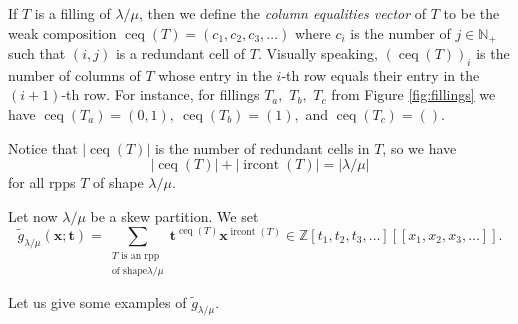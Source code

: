 \documentclass[12pt]{article}
\theoremstyle{plain}
\theoremstyle{definition}
\let\sumnonlimits\sum
\renewcommand{\sum}{\sumnonlimits\limits}
\def\ceq{{\operatorname{ceq}}}
\def\ircont{{\operatorname{ircont}}}
\def\t{{\mathbf{t}}}
\def\lm{{\lambda/\mu}}
\def\Z{{\mathbb{Z}}}
\begin{document}
 If $T$ is a filling of $\lm$,
then we define the \textit{column equalities vector} of $T$ to be the weak composition
$\operatorname{ceq}\left(  T\right)=\left(c_1,c_2,c_3,\dots\right)$
where $c_i$ is the number of $j\in\mathbb{N}_{+}$ such that $\left(  i,j\right)$ is a redundant cell of $T$. Visually speaking, $\left(  \operatorname{ceq}\left(  T\right)  \right)
_{i}$ is the number of columns of $T$ whose entry in the $i$-th row equals
their entry in the $\left(  i+1\right)  $-th row. For instance, for fillings $T_a,$ $T_b,$ $T_c$ from Figure \ref{fig:fillings} we have $\ceq(T_a)=(0,1),\ \ceq(T_b)=(1),$ and $\ceq(T_c)=()$.

Notice that $\left|\ceq(T)\right|$ is the number of redundant cells in $T$, so we have 
\begin{equation}\label{eq:sum.of.ceq.and.ircont}
 \left|\ceq(T)\right|+\left|\ircont(T)\right|=\left|\lm\right|
\end{equation}
 for all rpps $T$ of shape $\lm$. 




Let now $\lambda/\mu$ be a skew partition. We set%
\[
\widetilde{g}_{\lambda/\mu}(\mathbf{x};\t)=\sum_{\substack{T\text{ is an rpp}\\\text{of shape
}\lm  }}\mathbf{t}^{\operatorname*{ceq}\left(
T\right)  }\mathbf{x}^{\operatorname*{ircont}\left(  T\right)  }
\in \Z\left[t_1, t_2, t_3, \ldots\right]\left[\left[x_1, x_2, x_3, \ldots\right]\right] .
\]


Let us give some examples of $\widetilde{g}_{\lambda/\mu}$.
\end{document}
